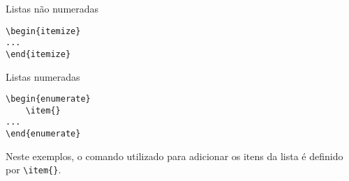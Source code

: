 \begin{trailer}{Listas n\~ao numeradas}
\begin{verbatim}
\begin{itemize}
...
\end{itemize}
\end{verbatim}
\end{trailer}

\begin{trailer}{Listas numeradas}
\begin{verbatim}
\begin{enumerate}
    \item{}
...
\end{enumerate}
\end{verbatim}
\end{trailer}

\noindent Neste exemplos, o comando utilizado para adicionar os itens da lista \'e definido por \texttt{\textbackslash item\{\}}.

